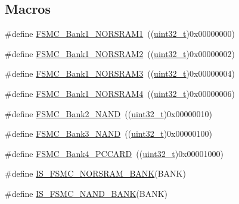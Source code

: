 \subsection*{Macros}
\begin{DoxyCompactItemize}
\item 
\#define \hyperlink{group___f_s_m_c___n_o_r_s_r_a_m___bank_ga514a05828041fa1a13d464c9e4a0a4a9}{F\+S\+M\+C\+\_\+\+Bank1\+\_\+\+N\+O\+R\+S\+R\+A\+M1}~((\hyperlink{_p_e___types_8h_a33594304e786b158f3fb30289278f5af}{uint32\+\_\+t})0x00000000)
\item 
\#define \hyperlink{group___f_s_m_c___n_o_r_s_r_a_m___bank_gaef52862c652370b9a658478d275dd956}{F\+S\+M\+C\+\_\+\+Bank1\+\_\+\+N\+O\+R\+S\+R\+A\+M2}~((\hyperlink{_p_e___types_8h_a33594304e786b158f3fb30289278f5af}{uint32\+\_\+t})0x00000002)
\item 
\#define \hyperlink{group___f_s_m_c___n_o_r_s_r_a_m___bank_ga151b02506a318ac77382b52f3b5e16f4}{F\+S\+M\+C\+\_\+\+Bank1\+\_\+\+N\+O\+R\+S\+R\+A\+M3}~((\hyperlink{_p_e___types_8h_a33594304e786b158f3fb30289278f5af}{uint32\+\_\+t})0x00000004)
\item 
\#define \hyperlink{group___f_s_m_c___n_o_r_s_r_a_m___bank_ga1083572834aa084d21e6698c280f8f74}{F\+S\+M\+C\+\_\+\+Bank1\+\_\+\+N\+O\+R\+S\+R\+A\+M4}~((\hyperlink{_p_e___types_8h_a33594304e786b158f3fb30289278f5af}{uint32\+\_\+t})0x00000006)
\item 
\#define \hyperlink{group___f_s_m_c___n_a_n_d___bank_ga294e7134aa329a09e56b61eec9882a27}{F\+S\+M\+C\+\_\+\+Bank2\+\_\+\+N\+A\+ND}~((\hyperlink{_p_e___types_8h_a33594304e786b158f3fb30289278f5af}{uint32\+\_\+t})0x00000010)
\item 
\#define \hyperlink{group___f_s_m_c___n_a_n_d___bank_gaf72def0732c026b0245d721ee371c85b}{F\+S\+M\+C\+\_\+\+Bank3\+\_\+\+N\+A\+ND}~((\hyperlink{_p_e___types_8h_a33594304e786b158f3fb30289278f5af}{uint32\+\_\+t})0x00000100)
\item 
\#define \hyperlink{group___f_s_m_c___p_c_c_a_r_d___bank_gad08ce7c7afc462f3d9ef085b05d42387}{F\+S\+M\+C\+\_\+\+Bank4\+\_\+\+P\+C\+C\+A\+RD}~((\hyperlink{_p_e___types_8h_a33594304e786b158f3fb30289278f5af}{uint32\+\_\+t})0x00001000)
\item 
\#define \hyperlink{group___f_s_m_c___exported___constants_ga3e3bed3dd83d38e63f11ac4cbcb87304}{I\+S\+\_\+\+F\+S\+M\+C\+\_\+\+N\+O\+R\+S\+R\+A\+M\+\_\+\+B\+A\+NK}(B\+A\+NK)
\item 
\#define \hyperlink{group___f_s_m_c___exported___constants_ga725bada099197f15f49dc0c5be00e19b}{I\+S\+\_\+\+F\+S\+M\+C\+\_\+\+N\+A\+N\+D\+\_\+\+B\+A\+NK}(B\+A\+NK)

\end{DoxyCompactItemize}
